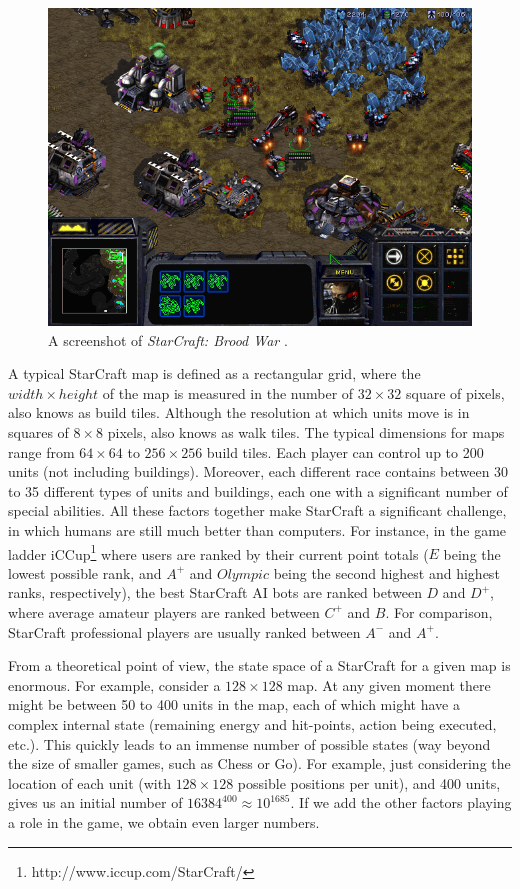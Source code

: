 \documentclass[journal]{IEEEtran}
\begin{document}
\begin{figure}
    \centering
    \includegraphics[width=0.8\columnwidth]{figures/starcraft1.png}
    \caption{A screenshot of \emph{StarCraft: Brood War}%
    .}
    \label{fig:StarCraft}
\end{figure}

A typical StarCraft map is defined as a rectangular grid, where the $width \times height$ of the map is measured in the number of $32 \times 32$ square of pixels, also knows as build tiles. Although the
resolution  at which  units  move  is in squares of $8 \times 8$ pixels, also knows as walk tiles. The typical dimensions for maps range from $64 \times 64$ to $256 \times 256$ build tiles. Each player  can
control up  to 200 units (not including  buildings).  Moreover, each
different race  contains between 30  to 35 different types  of units
and  buildings,  each  one  with  a significant  number  of  special
abilities. All these factors  together make StarCraft a significant
challenge,   in   which   humans    are   still   much   better   than
computers. For instance, in the game ladder iCCup\footnote{http://www.iccup.com/StarCraft/} where users are ranked by their current point totals ($E$ being the lowest possible rank, and $A^+$ and $Olympic$ being the second highest and highest ranks, respectively), the best StarCraft AI bots are ranked between $D$ and $D^+$, where average  amateur players are  ranked between $C^+$ and  $B$. For comparison, StarCraft professional  players are usually ranked between
$A^-$ and $A^+$.

From a theoretical point of view, the state space of a StarCraft for a given map is enormous. For example, consider a $128 \times 128$ map. At any given moment there might be between 50 to 400 units in the map, each of which might have a complex internal state (remaining energy and hit-points, action being executed, etc.). This quickly leads to an immense number of possible states (way beyond the size of smaller games, such as Chess or Go). For example, just considering the location of each unit (with $128 \times 128$ possible positions per unit), and 400 units, gives us an initial number of $16384^{400} \approx 10^{1685}$. If we add the other factors playing a role in the game, we obtain even larger numbers. 
\end{document}
